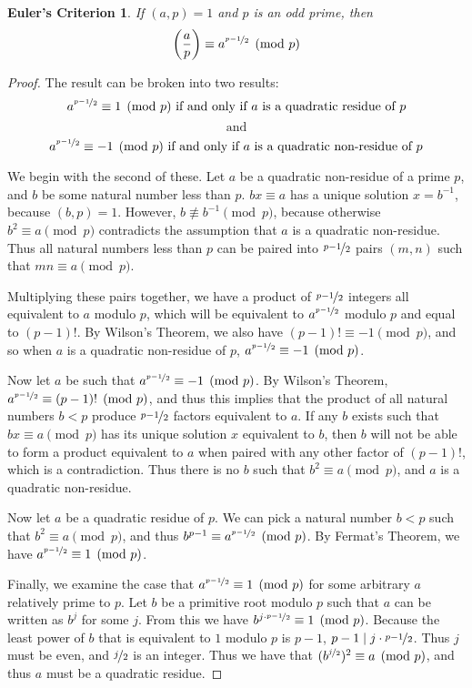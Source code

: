 \documentclass{article}
\begin{document}
\newtheorem*{eulercriterion}{Euler's Criterion}
\begin{eulercriterion}
If $(a,p)  = 1$ and $p$ is an odd prime, then 
	$$ \left( \dfrac{a}{p} \right)  \equiv a^{\nicefrac{p-1}{2}} \pmod p$$
\end{eulercriterion}
\begin{proof}
The result can be broken into two results:
	$$a^{\nicefrac{p-1}{2}} \equiv 1 \pmod p \text{ if and only if } a \text{ is a quadratic residue of } p$$
	$$\text{ and }$$
	$$a^{\nicefrac{p-1}{2}} \equiv -1 \pmod p \text{ if and only if } a \text{ is a quadratic non-residue of } p$$
	
\par We begin with the second of these. Let $a$ be a quadratic non-residue of a prime $p$, and $b$ be some natural number less than $p$. $bx \equiv a$ has a unique solution $x = b^{-1}$, because $(b,p) = 1$. However, $b \not \equiv b^{-1} \pmod p$, because otherwise $b^2 \equiv a \pmod p$ contradicts the assumption that $a$ is a quadratic non-residue. Thus all natural numbers less than $p$ can be paired into $\nicefrac{p-1}{2}$ pairs $(m,n)$ such that $mn \equiv a \pmod p$. 
\par Multiplying these pairs together, we have a product of  $\nicefrac{p-1}{2}$ integers all equivalent to $a$ modulo $p$, which will be equivalent to $a^{\nicefrac{p-1}{2}}$ modulo $p$ and  equal to $(p-1)!$. By Wilson's Theorem, we also have $(p-1)! \equiv -1 \pmod p$, and so when $a$ is a quadratic non-residue of $p$, $a^{\nicefrac{p-1}{2}} \equiv -1 \pmod p$.
\par Now let $a$ be such that $a^{\nicefrac{p-1}{2}} \equiv -1 \pmod p$. By Wilson's Theorem, $a^{\nicefrac{p-1}{2}} \equiv (p-1)! \pmod p$, and thus this implies that the product of all natural  numbers $b < p$ produce $\nicefrac{p-1}{2}$ factors equivalent to $a$. If any $b$ exists such that $bx \equiv
  a \pmod p$ has its unique solution $x$ equivalent to $b$, then $b$ will not be able to form a product equivalent to $a$ when paired with any other
   factor of $(p-1)!$, which is a contradiction. Thus there is no $b$ such that $b^2 \equiv a \pmod p$, and $a$ is a quadratic non-residue.
\par Now let $a$ be a quadratic residue of $p$. We can pick a natural number $b < p$ such that $b^2 \equiv a \pmod p$, and thus $ b^{p-1} \equiv
 a^{\nicefrac{p-1}{2}} \pmod p$. By Fermat's Theorem, we have $ a^{\nicefrac{p-1}{2}} \equiv 1 \pmod p$.
\par Finally, we examine the case that  $a^{\nicefrac{p-1}{2}} \equiv 1 \pmod p$ for some arbitrary $a$ relatively prime to $p$. Let $b$ be a primitive root
 modulo $p$ such that $a$ can be written as $b^j$ for some $j$. From this we have $b^{j \cdot \nicefrac{p-1}{2}} \equiv 1 \pmod p$. Because the least power of $b$ that is equivalent to $1$ modulo $p$ is $p-1$, $p -1 \mid j \cdot \nicefrac{p-1}{2}$. Thus $j$ must be even, and $\nicefrac{j}{2}$ is an integer.
Thus we have that $(b^{\nicefrac{j}{2}})^2 \equiv a \pmod p$, and thus $a$ must be a quadratic residue.
	
\end{proof}
\end{document}

